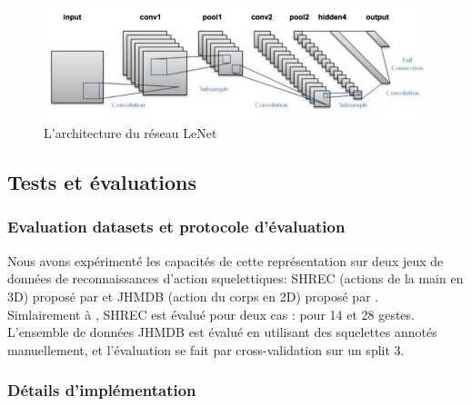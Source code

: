\begin{figure}[H]
    \centering
    \includegraphics[width=0.85\linewidth]{Images/lenet_architecture.png}
    \caption{L'architecture du réseau LeNet}
    \label{fig:Lenet}
\end{figure}

\subsection{Tests et évaluations}
\subsubsection{Evaluation datasets et protocole d'évaluation}
Nous avons expérimenté les capacités de cette représentation sur deux jeux de données de reconnaissances d'action squelettiques: SHREC (actions de la main en 3D) proposé par \cite{de2017shrec} et JHMDB (action du corps en 2D)  proposé par \cite{jhuang2013towards}.\\

Simlairement à \cite{2019arXiv190709658Y}, SHREC est évalué pour deux cas : pour 14 et 28 gestes. L'ensemble de données JHMDB est évalué en utilisant des squelettes annotés manuellement, et l'évaluation se fait par cross-validation sur un split 3.

\subsubsection{Détails d'implémentation}

